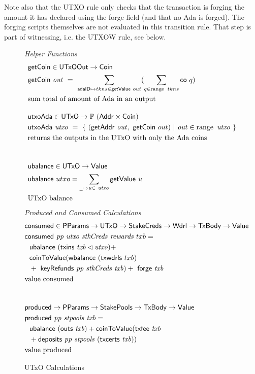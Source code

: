 Note also that the UTXO rule only checks that the transaction is forging the
amount it has declared using the forge field (and that no Ada is forged).
The forging scripts themselves are not evaluated in this transition rule.
That step is part of witnessing, i.e. the UTXOW rule, see below.

\begin{figure}[htb]
  \emph{Helper Functions}
  \begin{align*}
    & \fun{getCoin} \in \UTxOOut \to \Coin \\
    & \fun{getCoin}~{\var{out}} ~=~\sum_{\mathsf{adaID} \mapsto tkns \in \fun{getValue}~out}
       (\sum_{q \in \range~{tkns}} \fun{co}~q) \\
    & \text{sum total of amount of Ada in an output}
    \nextdef
    & \fun{utxoAda} \in \UTxO \to \powerset{(\Addr \times \Coin)} \\
    & \fun{utxoAda}~{\var{utxo}} ~=~\{~(\fun{getAddr}~\var{out},~\fun{getCoin}~{out})
    ~\vert~ \var{out} \in \range~\var{utxo} ~\} \\
    & \text{returns the outputs in the UTxO with only the Ada coins} \\
    \nextdef
    & \fun{ubalance} \in \UTxO \to \Value \\
    & \fun{ubalance} ~ utxo = \sum_{\wcard\mapsto\var{u}\in~\var{utxo}}
    \fun{getValue}~\var{u} \\
    & \text{UTxO balance} \\
  \end{align*}
  \emph{Produced and Consumed Calculations}
  \begin{align*}
    & \fun{consumed} \in \PParams \to \UTxO \to \StakeCreds \to \Wdrl \to \TxBody \to \Value \\
    & \consumed{pp}{utxo}{stkCreds}{rewards}~{txb} = \\
    & ~~\ubalance{(\txins{txb} \restrictdom \var{utxo})} + \\
    &~~  \fun{coinToValue}(\fun{wbalance}~(\fun{txwdrls}~{txb})~\\
        &~~+~ \keyRefunds{pp}{stkCreds}{txb}) +
        ~\fun{forge}~\var{txb} \\
    & \text{value consumed} \\
    \nextdef
    & \fun{produced} \to \PParams \to \StakePools \to \TxBody \to \Value \\
    & \fun{produced}~\var{pp}~\var{stpools}~\var{txb} = \\
    &~~\ubalance{(\fun{outs}~{txb})}  + \fun{coinToValue}(\txfee{txb} \\
    &~~+ \deposits{pp}{stpools}~{(\txcerts{txb})})\\
    & \text{value produced} \\
  \end{align*}
  \caption{UTxO Calculations}
  \label{fig:functions:utxo}
\end{figure}

